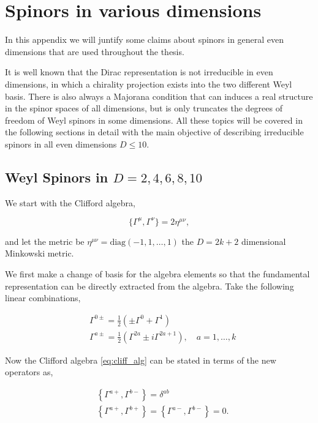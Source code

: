 \chapter{Spinors in various dimensions}
\label{ap:spinors}

In this appendix we will juntify some claims about spinors in general even dimensions that are used throughout the thesis.

It is well known that the Dirac representation is not irreducible in even dimensions, in which a chirality projection exists into the two different Weyl basis. There is also always a Majorana condition that can induces a real structure in the spinor spaces of all dimensions, but is only truncates the degrees of freedom of Weyl spinors in some dimensions. All these topics will be covered in the following sections in detail with the main objective of describing irreducible spinors in all even dimensions $D \leq 10$.

\section{Weyl Spinors in $D = 2,4,6,8,10$}

We start with the Clifford algebra,

\begin{equation}
    \label{eq:cliff_alg}
    \{ \Gamma^\mu, \Gamma^\nu \} = 2\eta^{\mu \nu},
\end{equation}

and let the metric be $\eta^{\mu \nu} = \text{diag}\left( -1,1,\dots,1 \right)$ the $D = 2k + 2$ dimensional Minkowski metric.

We first make a change of basis for the algebra elements so that the fundamental representation can be directly extracted from the algebra. Take the following linear combinations,

\begin{align}
    \label{eq:cliff_rebase}
    & \Gamma^{0 \pm}=\frac{1}{2}\left( \pm \Gamma^0+\Gamma^1\right) \\
    & \Gamma^{a \pm}=\frac{1}{2}\left(\Gamma^{2 a} \pm i \Gamma^{2 a+1}\right), \quad a=1, \ldots, k
\end{align}

Now the Clifford algebra \ref{eq:cliff_alg} can be stated in terms of the new operators as,

\begin{equation}
    \begin{aligned}
    & \left\{\Gamma^{a+}, \Gamma^{b-}\right\}=\delta^{a b} \\
    & \left\{\Gamma^{a+}, \Gamma^{b+}\right\}=\left\{\Gamma^{a-}, \Gamma^{b-}\right\}=0 .
    \end{aligned}
\end{equation}

